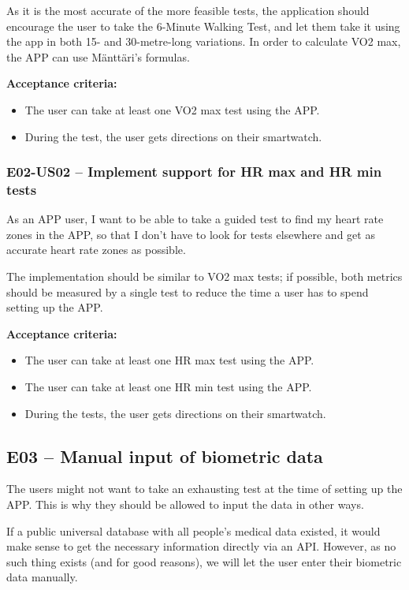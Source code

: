 As it is the most accurate of the more feasible tests, the application should encourage the user to take the 6-Minute Walking Test, and let them take it using the app in both 15- and 30-metre-long variations.
In order to calculate VO2 max, the APP can use Mänttäri's formulas.

\textbf{Acceptance criteria:}
\begin{itemize}
    \item The user can take at least one VO2 max test using the APP.
    \item During the test, the user gets directions on their smartwatch.
\end{itemize}

\subsubsection*{E02-US02 -- Implement support for HR max and HR min tests}
As an APP user, I want to be able to take a guided test to find my heart rate zones in the APP, so that I don't have to look for tests elsewhere and get as accurate heart rate zones as possible.

The implementation should be similar to VO2 max tests; if possible, both metrics should be measured by a single test to reduce the time a user has to spend setting up the APP.

\textbf{Acceptance criteria:}
\begin{itemize}
    \item The user can take at least one HR max test using the APP.
    \item The user can take at least one HR min test using the APP.
    \item During the tests, the user gets directions on their smartwatch.
\end{itemize}


\subsection*{E03 -- Manual input of biometric data}
The users might not want to take an exhausting test at the time of setting up the APP.
This is why they should be allowed to input the data in other ways.

If a public universal database with all people's medical data existed, it would make sense to get the necessary information directly via an API.
However, as no such thing exists (and for good reasons), we will let the user enter their biometric data manually.

